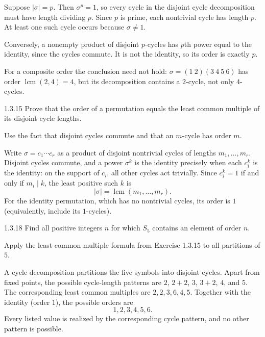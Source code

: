 \documentclass[11pt,oneside]{article}
\begin{document}
\begin{solution}
Suppose $|\sigma|=p$. Then $\sigma^p=1$, so every cycle in the disjoint cycle decomposition must have length dividing $p$. Since $p$ is prime, each nontrivial cycle has length $p$. At least one such cycle occurs because $\sigma\ne1$.

Conversely, a nonempty product of disjoint $p$-cycles has $p$th power equal to the identity, since the cycles commute. It is not the identity, so its order is exactly $p$.

For a composite order the conclusion need not hold: $\sigma=(1\ 2)(3\ 4\ 5\ 6)$ has order $\operatorname{lcm}(2,4)=4$, but its decomposition contains a $2$-cycle, not only $4$-cycles.
\end{solution}

\begin{exercise}{1.3.15}
Prove that the order of a permutation equals the least common multiple of its disjoint cycle lengths.
\end{exercise}

\begin{hint}
Use the fact that disjoint cycles commute and that an $m$-cycle has order $m$.
\end{hint}

\begin{solution}
Write $\sigma=c_1\cdots c_r$ as a product of disjoint nontrivial cycles of lengths $m_1,\ldots,m_r$. Disjoint cycles commute, and a power $\sigma^k$ is the identity precisely when each $c_i^k$ is the identity: on the support of $c_i$, all other cycles act trivially. Since $c_i^k=1$ if and only if $m_i\mid k$, the least positive such $k$ is
\[
 |\sigma|=\operatorname{lcm}(m_1,\ldots,m_r).
\]
For the identity permutation, which has no nontrivial cycles, its order is $1$ (equivalently, include its $1$-cycles).
\end{solution}

\begin{exercise}{1.3.18}
Find all positive integers $n$ for which $S_5$ contains an element of order $n$.
\end{exercise}

\begin{hint}
Apply the least-common-multiple formula from Exercise 1.3.15 to all partitions of $5$.
\end{hint}

\begin{solution}
A cycle decomposition partitions the five symbols into disjoint cycles. Apart from fixed points, the possible cycle-length patterns are $2$, $2+2$, $3$, $3+2$, $4$, and $5$. The corresponding least common multiples are $2,2,3,6,4,5$. Together with the identity (order $1$), the possible orders are
\[
 \boxed{1,2,3,4,5,6}.
\]
Every listed value is realized by the corresponding cycle pattern, and no other pattern is possible.
\end{solution}
\end{document}
